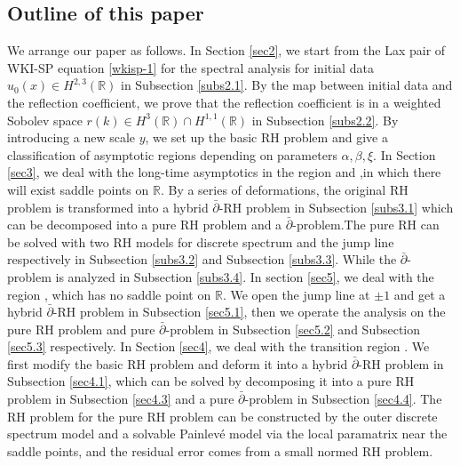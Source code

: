 \documentclass[11pt]{article}
\numberwithin{equation}{section}
\begin{document}
\subsection{Outline of this paper}
We arrange our paper as follows. In Section \ref{sec2}, we  start from the Lax pair of WKI-SP equation \eqref{wkisp-1} for the spectral analysis for initial data
  $u_0(x) \in H^{2,3}(\mathbb{R})$ in Subsection \ref{subs2.1}. By the map between initial data and the reflection coefficient, we prove that the reflection coefficient is in a  weighted Sobolev space $r(k)\in H^3(\mathbb{R})\cap H^{1,1}(\mathbb{R})$ in Subsection \ref{subs2.2}. By introducing a new scale $y$, we set up the basic RH problem and give a classification of asymptotic regions depending on parameters $\alpha,\beta,\xi$. In Section \ref{sec3}, we deal with the long-time asymptotics in  the region \uppercase\expandafter{} and \uppercase\expandafter{},in which there will exist  saddle points on $\mathbb{R}$. By a series of deformations, the original RH problem is transformed into a hybrid $\bar\partial$-RH problem in Subsection \ref{subs3.1} which can be decomposed into a pure RH problem and a $\bar{\partial}$-problem.The pure RH can be solved   with two  RH models for discrete spectrum and the jump line respectively in Subsection \ref{subs3.2} and Subsection \ref{subs3.3}. While  the $\bar{\partial}$-problem is analyzed in Subsection \ref{subs3.4}. In section \ref{sec5}, we deal with the region \uppercase\expandafter{}, which has no saddle point on $\mathbb{R}$. We open the jump line at $\pm1$ and get a hybrid $\bar{\partial}$-RH problem in Subsection \ref{sec5.1}, then we operate the analysis on the pure RH problem and pure $\bar{\partial}$-problem in Subsection \ref{sec5.2} and Subsection \ref{sec5.3} respectively. In Section \ref{sec4}, we deal with the transition region \uppercase\expandafter{}. We first modify the basic RH problem and deform it into a  hybrid $\bar\partial$-RH problem in Subsection \ref{sec4.1},
   which can be solved   by decomposing it into a pure RH problem in Subsection \ref{sec4.3}  and a pure $\bar\partial$-problem in Subsection \ref{sec4.4}. The  RH problem  for the pure RH problem can be  constructed by the outer discrete spectrum model and a solvable Painlev\'e model  via the local paramatrix near the saddle points, and the residual error   comes  from a small normed RH problem.
\end{document}
